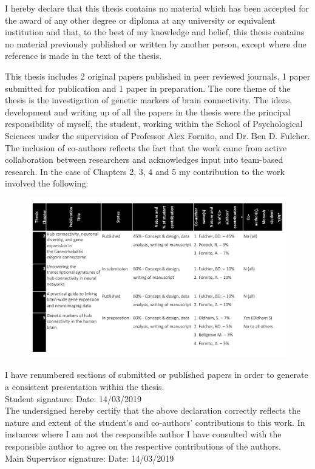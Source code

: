 \vspace*{20mm}
\vspace{10mm}

I hereby declare that this thesis contains no material which has been accepted for the award of any other degree or diploma at any university or equivalent institution and that, to the best of my knowledge and belief, this thesis contains no material previously published or written by another person, except where due reference is made in the text of the thesis. 

This thesis includes 2 original papers published in peer reviewed journals, 1 paper submitted for publication and 1 paper in preparation. The core theme of the thesis is the investigation of genetic markers of brain connectivity. The ideas, development and writing up of all the papers in the thesis were the principal responsibility of myself, the student, working within the School of Psychological Sciences under the supervision of Professor Alex Fornito, and Dr. Ben D. Fulcher. The inclusion of co-authors reflects the fact that the work came from active collaboration between researchers and acknowledges input into team-based research. In the case of Chapters 2, 3, 4 and 5 my contribution to the work involved the following:

\begin{figure}[h!]
    \includegraphics[width=1\textwidth]{declarationTable.pdf}
\label{declaration}
\end{figure}

\newpage
I have renumbered sections of submitted or published papers in order to generate a consistent presentation within the thesis.\\

Student signature:\hspace{6cm}
Date: 14/03/2019\\

The undersigned hereby certify that the above declaration correctly reflects the nature and extent of the student’s and co-authors’ contributions to this work. In instances where I am not the responsible author I have consulted with the responsible author to agree on the respective contributions of the authors.\\


Main Supervisor signature:\hspace{4.5cm}
Date: 14/03/2019\\

